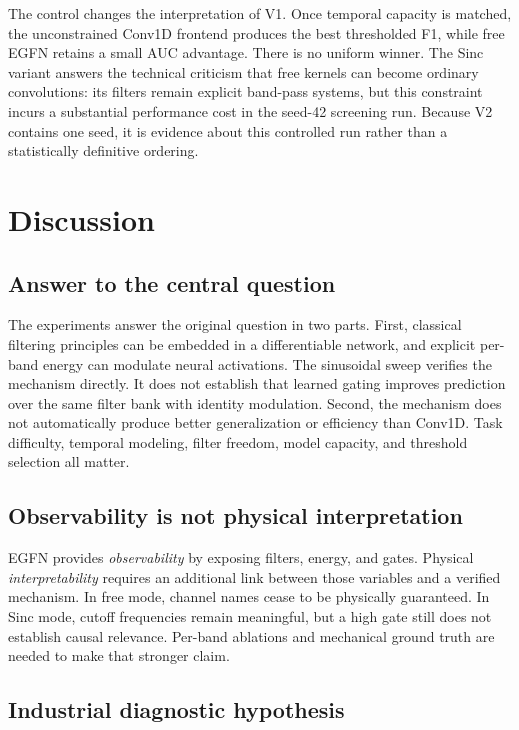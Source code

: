 \documentclass[10pt,twocolumn]{article}
\newcommand{\egfn}{EGFN}
\begin{document}
The control changes the interpretation of V1. Once temporal capacity is
matched, the unconstrained Conv1D frontend produces the best thresholded F1,
while free \egfn{} retains a small AUC advantage. There is no uniform winner.
The Sinc variant answers the technical criticism that free kernels can become
ordinary convolutions: its filters remain explicit band-pass systems, but this
constraint incurs a substantial performance cost in the seed-42 screening run.
Because V2 contains one seed, it is evidence about this controlled run rather
than a statistically definitive ordering.

\section{Discussion}

\subsection{Answer to the central question}

The experiments answer the original question in two parts. First, classical
filtering principles can be embedded in a differentiable network, and explicit
per-band energy can modulate neural activations. The sinusoidal sweep verifies
the mechanism directly. It does not establish that learned gating improves
prediction over the same filter bank with identity modulation. Second, the
mechanism does not automatically produce better generalization or efficiency
than Conv1D. Task difficulty, temporal modeling, filter freedom, model capacity,
and threshold selection all matter.

\subsection{Observability is not physical interpretation}

\egfn{} provides \emph{observability} by exposing filters, energy, and gates.
Physical \emph{interpretability} requires an additional link between those
variables and a verified mechanism. In free mode, channel names cease to be
physically guaranteed. In Sinc mode, cutoff frequencies remain meaningful, but
a high gate still does not establish causal relevance. Per-band ablations and
mechanical ground truth are needed to make that stronger claim.

\subsection{Industrial diagnostic hypothesis}
\end{document}
